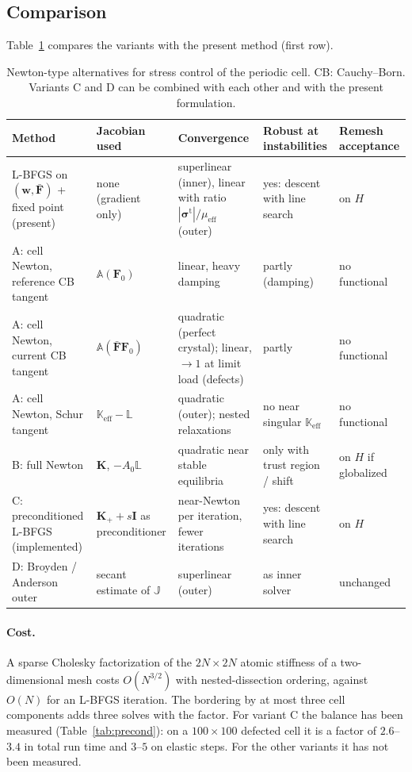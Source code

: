\documentclass[11pt,a4paper]{article}
\newcommand{\Fb}{\bar{\mathbf F}}
\newcommand{\sigt}{\bm\sigma^{\mathrm t}}
\newcommand{\F}{\mathbf F}
\newcommand{\I}{\mathbf I}
\newcommand{\w}{\mathbf w}
\begin{document}
\subsection{Comparison}

Table~\ref{tab:newton} compares the variants with the present method (first row).

\begin{table}[ht]
\centering\small
\begin{tabular}{@{}>{\raggedright\arraybackslash}p{3.0cm}>{\raggedright\arraybackslash}p{2.5cm}>{\raggedright\arraybackslash}p{3.4cm}>{\raggedright\arraybackslash}p{2.6cm}>{\raggedright\arraybackslash}p{2.2cm}@{}}
\toprule
Method & Jacobian used & Convergence & Robust at instabilities & Remesh acceptance\\
\midrule
L-BFGS on \((\w,\Fb)\) + fixed point (present) & none (gradient only) &
  superlinear (inner), linear with ratio \(|\sigt|/\mu_{\mathrm{eff}}\) (outer) &
  yes: descent with line search & on \(H\)\\
A: cell Newton, reference CB tangent & \(\mathbb A(\F_0)\) & linear, heavy damping & partly (damping) & no functional\\
A: cell Newton, current CB tangent & \(\mathbb A(\Fb\F_0)\) & quadratic (perfect crystal); linear, \(\to1\) at limit load (defects) & partly & no functional\\
A: cell Newton, Schur tangent & \(\mathbb K_{\mathrm{eff}}-\mathbb L\) & quadratic (outer); nested relaxations & no near singular \(\mathbb K_{\mathrm{eff}}\) & no functional\\
B: full Newton & \(\mathbf K\), \(-A_0\mathbb L\) & quadratic near stable equilibria & only with trust region / shift & on \(H\) if globalized\\
C: preconditioned L-BFGS (implemented) & \(\mathbf K_+ +s\I\) as preconditioner & near-Newton per iteration, fewer iterations & yes: descent with line search & on \(H\)\\
D: Broyden / Anderson outer & secant estimate of \(\mathbb J\) & superlinear (outer) & as inner solver & unchanged\\
\bottomrule
\end{tabular}
\caption{Newton-type alternatives for stress control of the periodic cell. CB: Cauchy--Born.
Variants C and D can be combined with each other and with the present formulation.}
\label{tab:newton}
\end{table}

\paragraph{Cost.}
A sparse Cholesky factorization of the \(2N\times2N\) atomic stiffness of a two-dimensional mesh
costs \(O(N^{3/2})\) with nested-dissection ordering, against \(O(N)\) for an L-BFGS iteration. The
bordering by at most three cell components adds three solves with the factor. For variant C the
balance has been measured (Table~\ref{tab:precond}): on a \(100\times100\) defected cell it is a
factor of \(2.6\)--\(3.4\) in total run time and \(3\)--\(5\) on elastic steps. For the other
variants it has not been measured.
\end{document}
